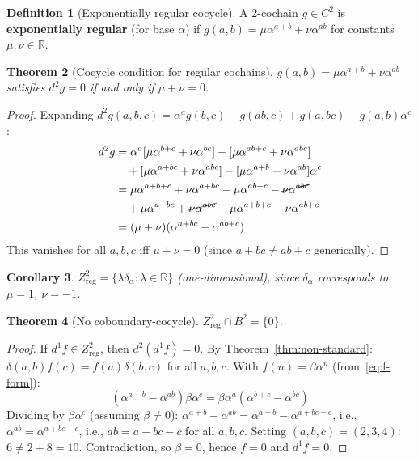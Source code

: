 \documentclass[11pt,a4paper]{article}
\theoremstyle{plain}
\newtheorem{theorem}{Theorem}[section]
\newtheorem{corollary}[theorem]{Corollary}
\theoremstyle{definition}
\newtheorem{definition}[theorem]{Definition}
\theoremstyle{remark}
\newcommand{\RR}{\mathbb{R}}
\begin{document}
\begin{definition}[Exponentially regular cocycle]
\label{def:regular}
A 2-cochain $g \in C^2$ is \textbf{exponentially regular} (for base 
$\alpha$) if $g(a,b) = \mu\alpha^{a+b} + \nu\alpha^{ab}$ for 
constants $\mu, \nu \in \RR$.
\end{definition}

\begin{theorem}[Cocycle condition for regular cochains]
\label{thm:regular-cocycles}
$g(a,b) = \mu\alpha^{a+b} + \nu\alpha^{ab}$ satisfies $d^2 g = 0$ if 
and only if $\mu + \nu = 0$.
\end{theorem}

\begin{proof}
Expanding $d^2 g(a,b,c) = \alpha^a g(b,c) - g(ab,c) + g(a,bc) - 
g(a,b)\alpha^c$:
\begin{align*}
d^2 g &= \alpha^a[\mu\alpha^{b+c} + \nu\alpha^{bc}] - 
[\mu\alpha^{ab+c} + \nu\alpha^{abc}] \\
&\quad + [\mu\alpha^{a+bc} + \nu\alpha^{abc}] - 
[\mu\alpha^{a+b} + \nu\alpha^{ab}]\alpha^c \\
&= \mu\alpha^{a+b+c} + \nu\alpha^{a+bc} - \mu\alpha^{ab+c} - 
\cancel{\nu\alpha^{abc}} \\
&\quad + \mu\alpha^{a+bc} + \cancel{\nu\alpha^{abc}} - 
\mu\alpha^{a+b+c} - \nu\alpha^{ab+c} \\
&= (\mu + \nu)(\alpha^{a+bc} - \alpha^{ab+c})
\end{align*}
This vanishes for all $a, b, c$ iff $\mu + \nu = 0$ (since 
$a + bc \neq ab + c$ generically).
\end{proof}

\begin{corollary}
\label{cor:Z2}
$Z^2_{\mathrm{reg}} = \{\lambda\delta_\alpha : \lambda \in \RR\}$ 
(one-dimensional), since $\delta_\alpha$ corresponds to $\mu = 1$, 
$\nu = -1$.
\end{corollary}

\begin{theorem}[No coboundary-cocycle]
\label{thm:B2-cap-Z2}
$Z^2_{\mathrm{reg}} \cap B^2 = \{0\}$.
\end{theorem}

\begin{proof}
If $d^1 f \in Z^2_{\mathrm{reg}}$, then $d^2(d^1 f) = 0$. By 
Theorem~\ref{thm:non-standard}: $\delta(a,b)f(c) = f(a)\delta(b,c)$ 
for all $a, b, c$. With $f(n) = \beta\alpha^n$ 
(from~\eqref{eq:f-form}):
\begin{equation*}
(\alpha^{a+b} - \alpha^{ab})\beta\alpha^c = 
\beta\alpha^a(\alpha^{b+c} - \alpha^{bc})
\end{equation*}
Dividing by $\beta\alpha^c$ (assuming $\beta \neq 0$): 
$\alpha^{a+b} - \alpha^{ab} = \alpha^{a+b} - \alpha^{a+bc-c}$, 
i.e., $\alpha^{ab} = \alpha^{a + bc - c}$, i.e., $ab = a + bc - c$ 
for all $a, b, c$. Setting $(a,b,c) = (2,3,4)$: $6 \neq 2 + 8 = 10$. 
Contradiction, so $\beta = 0$, hence $f = 0$ and $d^1 f = 0$.
\end{proof}
\end{document}
